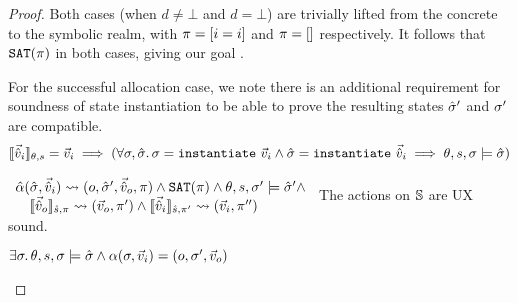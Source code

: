 \begin{proof}
\pfcase{$\alpha=\alloc$}

Both cases (when $d\neq\bot$ and $d=\bot$) are trivially lifted from the concrete to the symbolic realm, with $\pc=[i=i]$ and $\pc=[]$ respectively. It follows that $\SAT(\pc)$ in both cases, giving our goal .

For the successful allocation case, we note there is an additional requirement for soundness of state instantiation to be able to prove the resulting states $\sst'$ and $\st'$ are compatible.
\begin{align*}
	\expeval{\sins}=\ins \implies (\forall \st,\sst\ldotp \st=\code{instantiate}~\ins \land \sst=\code{instantiate}~\sins \implies \theta,s,\st\models\sst)
\end{align*}


\pfassume \begin{hypvlist}
 $
\begin{array}{l}
\ppexec{\hat\alpha}{\sst,\sins}{o,\sst',\souts, \pc} \land \SAT(\pc) \land \theta,s,\st'\models\sst' \land \\
\quad \expeval[\hat s,\pc]{\souts}\rightsquigarrow(\outs,\pc')\land \expeval[\hat s,\pc']{\sins}\rightsquigarrow(\ins,\pc'')
\end{array}
$
 The actions on $\mmdl$ are UX sound.
\end{hypvlist}
\pfprove \begin{goalvlist}
 $\exists \st\ldotp \theta,s,\st\models\sst \land \ppexecc{\alpha}{\st,\ins}{o,\st',\outs}$
\end{goalvlist}

\pfcase{$\alpha\in\actions_\mmdl$}


\end{proof}
